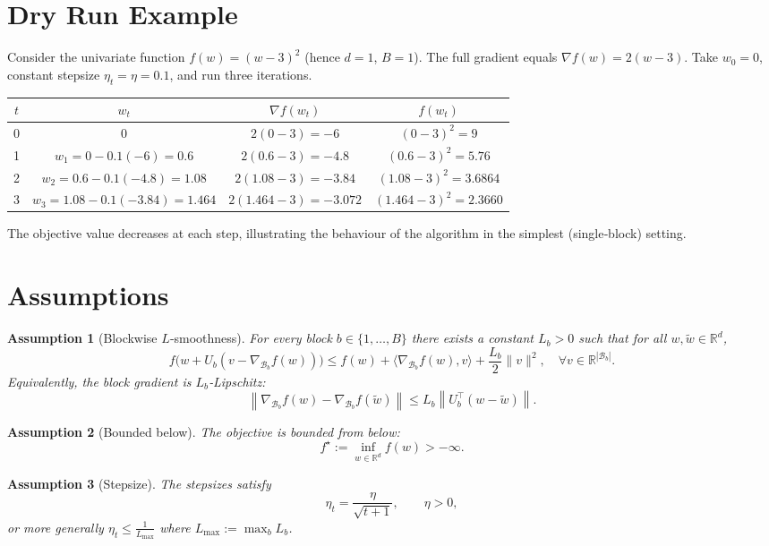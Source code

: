\documentclass[11pt]{article}
\newtheorem{assumption}{Assumption}
\newcommand{\R}{\mathbb{R}}
\newcommand{\norm}[1]{\left\|#1\right\|}
\newcommand{\block}[1]{\mathcal{B}_{#1}}
\begin{document}
\section*{Dry Run Example}
Consider the univariate function $f(w)=(w-3)^2$ (hence $d=1$, $B=1$).  
The full gradient equals $\nabla f(w)=2(w-3)$.  
Take $w_0=0$, constant stepsize $\eta_t=\eta=0.1$, and run three iterations.

\begin{center}
\begin{tabular}{c|c|c|c}
$t$ & $w_t$ & $\nabla f(w_t)$ & $f(w_t)$\\ \hline
0 & $0$ & $2(0-3)=-6$ & $(0-3)^2=9$\\
1 & $w_1=0-0.1(-6)=0.6$ & $2(0.6-3)=-4.8$ & $(0.6-3)^2=5.76$\\
2 & $w_2=0.6-0.1(-4.8)=1.08$ & $2(1.08-3)=-3.84$ & $(1.08-3)^2=3.6864$\\
3 & $w_3=1.08-0.1(-3.84)=1.464$ & $2(1.464-3)=-3.072$ & $(1.464-3)^2=2.3660$
\end{tabular}
\end{center}
The objective value decreases at each step, illustrating the behaviour of the algorithm in the simplest (single‑block) setting.

\newpage
\section*{Assumptions}
\begin{assumption}[Blockwise $L$‑smoothness]\label{ass:smooth}
For every block $b\in\{1,\dots ,B\}$ there exists a constant $L_b>0$ such that for all $w,\tilde w\in\R^{d}$,
\[
f\big(w+U_{b}(v-\nabla_{\block{b}} f(w))\big)
\le 
f(w)+\langle \nabla_{\block{b}} f(w),v\rangle+\frac{L_b}{2}\|v\|^{2},
\quad\forall v\in\R^{|\block{b}|}.
\]
Equivalently, the block gradient is $L_b$‑Lipschitz:
\[
\norm{\nabla_{\block{b}} f(w)-\nabla_{\block{b}} f(\tilde w)}\le L_b \norm{U_{b}^{\top}(w-\tilde w)}.
\]
\end{assumption}

\begin{assumption}[Bounded below]\label{ass:lower}
The objective is bounded from below:
\[
f^{\star}:=\inf_{w\in\R^{d}} f(w)>-\infty .
\]
\end{assumption}

\begin{assumption}[Stepsize]\label{ass:stepsize}
The stepsizes satisfy
\[
\eta_t = \frac{\eta}{\sqrt{t+1}},\qquad \eta>0,
\]
or more generally $\eta_t\le \frac{1}{L_{\max}}$ where $L_{\max}:=\max_{b}L_b$.
\end{assumption}
\end{document}
